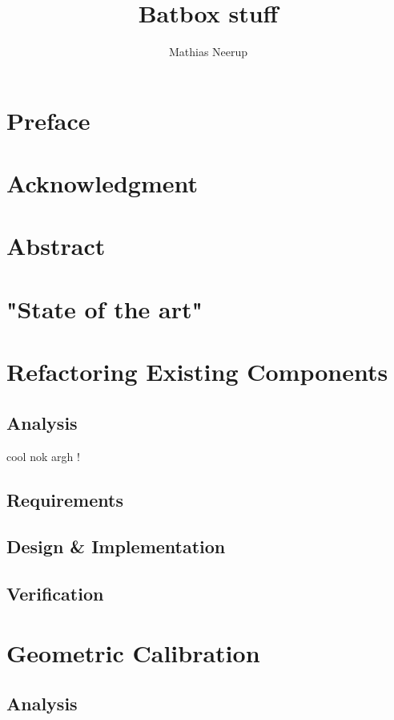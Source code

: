 \documentclass[10pt,a4paper]{memoir}
\author{Mathias Neerup}
\title{Batbox stuff}
\begin{document}
\maketitle
\tableofcontents

\frontmatter
\chapter{Preface}
\chapter{Acknowledgment}
\chapter{Abstract}


\newpage


\chapter{"State of the art"}
\mainmatter
\chapter{Refactoring Existing Components}
\section{Analysis}
cool nok
argh !
\section{Requirements}
\section{Design \& Implementation}
\section{Verification}

\chapter{Geometric Calibration}
\section{Analysis}
\end{document}
